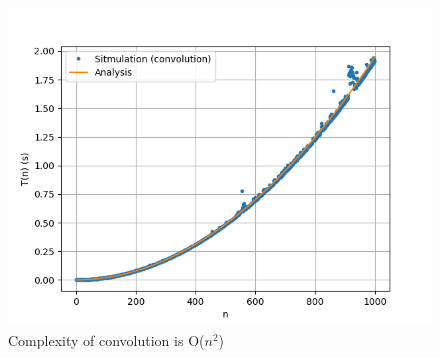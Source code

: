 \documentclass[journal,12pt,twocolumn]{IEEEtran}
\renewcommand\thesection{\arabic{section}}
\begin{document}
\begin{enumerate}[label=\thesection.\arabic*
,ref=\thesection.\theenumi]
\begin{figure}
\centering
\includegraphics[width=\columnwidth]{figs/6.7.2_plot.png}
\caption{Complexity of convolution is O($n^2$)}
\label{fig:Complexity convolution}
\end{figure}


\end{enumerate}
\end{document}
